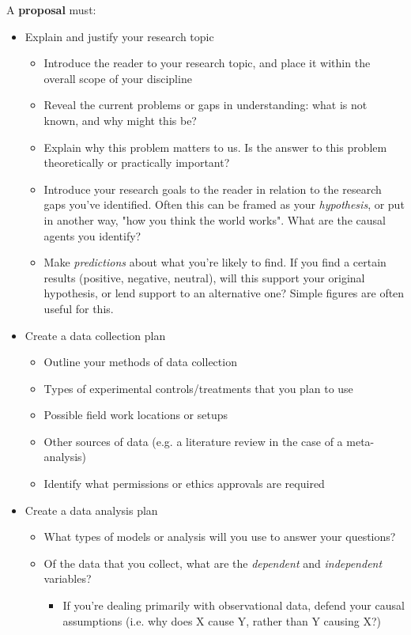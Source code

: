 \documentclass[11pt]{article}
\begin{document}
A \textbf{proposal} must:
\begin{itemize}
  \item Explain and justify your research topic
  \begin{itemize}
    \item Introduce the reader to your research topic, and place it within the overall scope of your discipline
    \item Reveal the current problems or gaps in understanding: what is not known, and why might this be?
    \item Explain why this problem matters to us. Is the answer to this problem theoretically or practically important? 
    \item Introduce your research goals to the reader in relation to the research gaps you've identified. Often this can be framed as your \emph{hypothesis}, or put in another way, "how you think the world works". What are the causal agents you identify?
    \item Make \emph{predictions} about what you're likely to find. If you find a certain results (positive, negative, neutral), will this support your original hypothesis, or lend support to an alternative one? Simple figures are often useful for this.
  \end{itemize}
  \item Create a data collection plan
  \begin{itemize}
    \item Outline your methods of data collection 
    \item Types of experimental controls/treatments that you plan to use
    \item Possible field work locations or setups
    \item Other sources of data (e.g. a literature review in the case of a meta-analysis)
    \item Identify what permissions or ethics approvals are required
  \end{itemize}
  \item Create a data analysis plan
  \begin{itemize}
    \item What types of models or analysis will you use to answer your questions?
    \item Of the data that you collect, what are the \emph{dependent} and \emph{independent} variables?
    \begin{itemize} 
      \item If you're dealing primarily with observational data, defend your causal assumptions (i.e. why does X cause Y, rather than Y causing X?)

\end{itemize}
\end{itemize}
\end{itemize}
\end{document}
